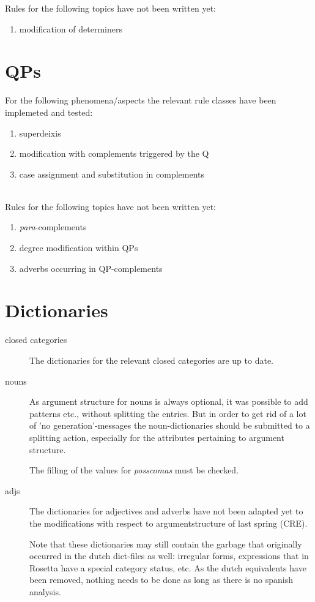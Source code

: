 Rules for the following topics have not been written yet:
\begin{enumerate}
  \item modification of determiners
\end{enumerate}

\section{QPs}
For the following phenomena/aspects the relevant 
rule classes have been implemeted and tested:
\begin{enumerate}
  \item superdeixis
  \item modification with complements triggered by the Q
  \item case assignment and substitution in complements
\end{enumerate}
\mbox{}\\

Rules for the following topics have not been written yet:
\begin{enumerate}
\item {\em para}-complements 
\item degree modification within QPs
\item adverbs occurring in QP-complements
\end{enumerate}

\section{Dictionaries}
\begin{description}
  \item[closed categories]
The dictionaries for the relevant closed categories are up to date.
  \item[nouns]

As argument structure for nouns
is always 
optional, it was possible to add patterns etc., without splitting the 
entries. 
But in order to 
get rid of a lot of 'no generation'-messages the 
noun-dictionaries should be submitted to a splitting action, especially for 
the attributes pertaining to argument structure. 

The filling of the values for {\em posscomas} must be checked.

\item [adjs]
The dictionaries for adjectives and adverbs have not been adapted yet to
the modifications with respect to argumentstructure of last spring (CRE).

Note that 
these dictionaries may still contain the garbage that originally occurred in 
the dutch dict-files as well: irregular forms, expressions that in Rosetta
have a special category status, etc. As the dutch equivalents have been 
removed, nothing needs to be done as long as there is no spanish analysis.



\end{description}

